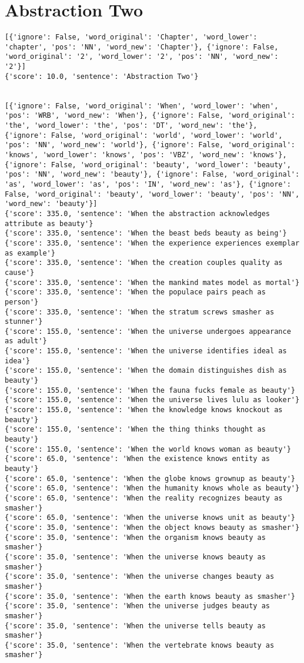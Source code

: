 \documentclass[12pt,a4paper,oneside]{book}
\begin{document}
\chapter*{Abstraction Two}
\begin{verbatim}
[{'ignore': False, 'word_original': 'Chapter', 'word_lower': 'chapter', 'pos': 'NN', 'word_new': 'Chapter'}, {'ignore': False, 'word_original': '2', 'word_lower': '2', 'pos': 'NN', 'word_new': '2'}]
{'score': 10.0, 'sentence': 'Abstraction Two'}


[{'ignore': False, 'word_original': 'When', 'word_lower': 'when', 'pos': 'WRB', 'word_new': 'When'}, {'ignore': False, 'word_original': 'the', 'word_lower': 'the', 'pos': 'DT', 'word_new': 'the'}, {'ignore': False, 'word_original': 'world', 'word_lower': 'world', 'pos': 'NN', 'word_new': 'world'}, {'ignore': False, 'word_original': 'knows', 'word_lower': 'knows', 'pos': 'VBZ', 'word_new': 'knows'}, {'ignore': False, 'word_original': 'beauty', 'word_lower': 'beauty', 'pos': 'NN', 'word_new': 'beauty'}, {'ignore': False, 'word_original': 'as', 'word_lower': 'as', 'pos': 'IN', 'word_new': 'as'}, {'ignore': False, 'word_original': 'beauty', 'word_lower': 'beauty', 'pos': 'NN', 'word_new': 'beauty'}]
{'score': 335.0, 'sentence': 'When the abstraction acknowledges attribute as beauty'}
{'score': 335.0, 'sentence': 'When the beast beds beauty as being'}
{'score': 335.0, 'sentence': 'When the experience experiences exemplar as example'}
{'score': 335.0, 'sentence': 'When the creation couples quality as cause'}
{'score': 335.0, 'sentence': 'When the mankind mates model as mortal'}
{'score': 335.0, 'sentence': 'When the populace pairs peach as person'}
{'score': 335.0, 'sentence': 'When the stratum screws smasher as stunner'}
{'score': 155.0, 'sentence': 'When the universe undergoes appearance as adult'}
{'score': 155.0, 'sentence': 'When the universe identifies ideal as idea'}
{'score': 155.0, 'sentence': 'When the domain distinguishes dish as beauty'}
{'score': 155.0, 'sentence': 'When the fauna fucks female as beauty'}
{'score': 155.0, 'sentence': 'When the universe lives lulu as looker'}
{'score': 155.0, 'sentence': 'When the knowledge knows knockout as beauty'}
{'score': 155.0, 'sentence': 'When the thing thinks thought as beauty'}
{'score': 155.0, 'sentence': 'When the world knows woman as beauty'}
{'score': 65.0, 'sentence': 'When the existence knows entity as beauty'}
{'score': 65.0, 'sentence': 'When the globe knows grownup as beauty'}
{'score': 65.0, 'sentence': 'When the humanity knows whole as beauty'}
{'score': 65.0, 'sentence': 'When the reality recognizes beauty as smasher'}
{'score': 65.0, 'sentence': 'When the universe knows unit as beauty'}
{'score': 35.0, 'sentence': 'When the object knows beauty as smasher'}
{'score': 35.0, 'sentence': 'When the organism knows beauty as smasher'}
{'score': 35.0, 'sentence': 'When the universe knows beauty as smasher'}
{'score': 35.0, 'sentence': 'When the universe changes beauty as smasher'}
{'score': 35.0, 'sentence': 'When the earth knows beauty as smasher'}
{'score': 35.0, 'sentence': 'When the universe judges beauty as smasher'}
{'score': 35.0, 'sentence': 'When the universe tells beauty as smasher'}
{'score': 35.0, 'sentence': 'When the vertebrate knows beauty as smasher'}


\end{verbatim}
\end{document}
